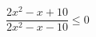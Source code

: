 \begin{ex}[type=inequality]
	\begin{condition}
		\( \dfrac{2x^2-x+10}{2x^2-x-10}\le0 \)
	\end{condition}
\end{ex}